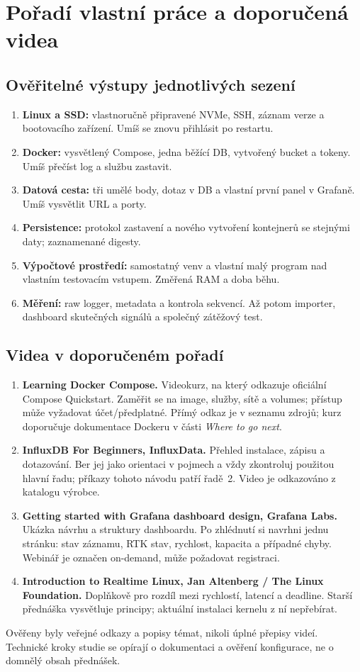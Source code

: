 \documentclass[11pt,a4paper]{article}
\begin{document}
\clearpage
\section{Pořadí vlastní práce a doporučená videa}
\subsection{Ověřitelné výstupy jednotlivých sezení}
\begin{enumerate}
\item \textbf{Linux a SSD:} vlastnoručně připravené NVMe, SSH, záznam verze a bootovacího zařízení. Umíš se znovu přihlásit po restartu.
\item \textbf{Docker:} vysvětlený Compose, jedna běžící DB, vytvořený bucket a tokeny. Umíš přečíst log a službu zastavit.
\item \textbf{Datová cesta:} tři umělé body, dotaz v DB a vlastní první panel v Grafaně. Umíš vysvětlit URL a porty.
\item \textbf{Persistence:} protokol zastavení a nového vytvoření kontejnerů se stejnými daty; zaznamenané digesty.
\item \textbf{Výpočtové prostředí:} samostatný venv a vlastní malý program nad vlastním testovacím vstupem. Změřená RAM a doba běhu.
\item \textbf{Měření:} raw logger, metadata a kontrola sekvencí. Až potom importer, dashboard skutečných signálů a společný zátěžový test.
\end{enumerate}

\subsection{Videa v doporučeném pořadí}
\begin{enumerate}
\item \textbf{Learning Docker Compose.} Videokurz, na který odkazuje oficiální Compose Quickstart. Zaměřit se na image, služby, sítě a volumes; přístup může vyžadovat účet/předplatné. Přímý odkaz je v seznamu zdrojů; kurz doporučuje dokumentace Dockeru v části \emph{Where to go next}.\cite{compose,video-compose}
\item \textbf{InfluxDB For Beginners, InfluxData.} Přehled instalace, zápisu a dotazování. Ber jej jako orientaci v pojmech a vždy zkontroluj použitou hlavní řadu; příkazy tohoto návodu patří řadě~2. Video je odkazováno z katalogu výrobce.\cite{video-influx}
\item \textbf{Getting started with Grafana dashboard design, Grafana Labs.} Ukázka návrhu a struktury dashboardu. Po zhlédnutí si navrhni jednu stránku: stav záznamu, RTK stav, rychlost, kapacita a případné chyby. Webinář je označen on-demand, může požadovat registraci.\cite{video-grafana}
\item \textbf{Introduction to Realtime Linux, Jan Altenberg / The Linux Foundation.} Doplňkově pro rozdíl mezi rychlostí, latencí a deadline. Starší přednáška vysvětluje principy; aktuální instalaci kernelu z ní nepřebírat.\cite{video-rt}
\end{enumerate}
Ověřeny byly veřejné odkazy a popisy témat, nikoli úplné přepisy videí. Technické kroky studie se opírají o dokumentaci a ověření konfigurace, ne o domnělý obsah přednášek.
\end{document}
